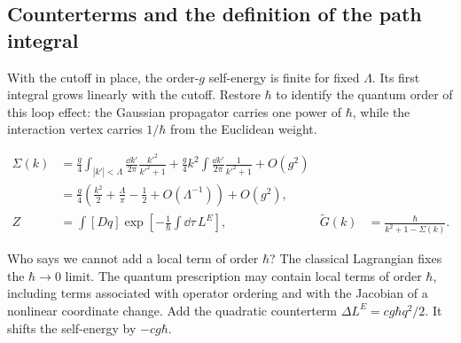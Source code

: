 \subsection{Counterterms and the definition of the path integral}

With the cutoff in place, the order-$g$ self-energy is finite for fixed $\Lambda$. Its first integral grows linearly with the cutoff. Restore $\hbar$ to identify the quantum order of this loop effect: the Gaussian propagator carries one power of $\hbar$, while the interaction vertex carries $1/\hbar$ from the Euclidean weight.

\begin{align}
  \Sigma(k)
  &=\frac g4\int_{|k'|<\Lambda}\frac{\dd k'}{2\pi}\frac{k'^2}{k'^2+1}
  +\frac g4k^2\int\frac{\dd k'}{2\pi}\frac1{k'^2+1}+O(g^2)
  \nonumber\\
  &=\frac g4\left(\frac{k^2}{2}+\frac{\Lambda}{\pi}-\frac12
  +O(\Lambda^{-1})\right)+O(g^2),
  \label{eq:253a-ch02-cutoff-self-energy}\\
  Z&=\int[Dq]\exp\!\left[-\frac1\hbar\int \dd\tau\,L^E\right],
  &\widetilde G(k)&=\frac\hbar{k^2+1-\Sigma(k)}.
  \label{eq:253a-ch02-restored-hbar}
\end{align}

Who says we cannot add a local term of order $\hbar$? The classical Lagrangian fixes the $\hbar\to0$ limit. The quantum prescription may contain local terms of order $\hbar$, including terms associated with operator ordering and with the Jacobian of a nonlinear coordinate change. Add the quadratic counterterm $\Delta L^E=cg\hbar q^2/2$. It shifts the self-energy by $-cg\hbar$.

